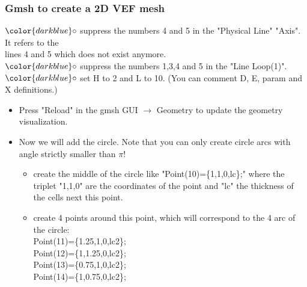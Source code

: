 \documentclass[10pt, hyperref={unicode=true,pdfusetitle, bookmarks=true,bookmarksnumbered=false,bookmarksopen=false, breaklinks=false,pdfborder={0 0l 1},backref=true,colorlinks=true,linkcolor=darkblue,pageanchor}]{beamer}
\begin{document}
\begin{frame}
\frametitle{Gmsh to create a 2D VEF mesh}
\begin{block}{}

\hspace{1cm} $\color{darkblue}\circ$ {\small{ suppress the numbers 4 and 5 in the "Physical Line" "Axis". It refers to the \\
\hspace{1.4cm} lines 4 and 5 which does not exist anymore.}}\\
\hspace{1cm} $\color{darkblue}\circ$ {\small{ suppress the numbers 1,3,4 and 5 in the "Line Loop(1)".}}\\
\hspace{1cm} $\color{darkblue}\circ$ {\small{ set H to 2 and L to 10. (You can comment D, E, param and X definitions.)}}

\begin{itemize}
\item Press "Reload" in the gmsh GUI $\rightarrow$ Geometry to update the geometry visualization.
\item Now we will add the circle. Note that you can only create circle arcs with angle strictly smaller than $\pi$!
    \begin{itemize}
    \item [$\circ$] create the middle of the circle like "Point(10)=\{1,1,0,lc\};" where the triplet "1,1,0" are the coordinates of the point and "lc" the thickness of the cells next this point.
    \item [$\circ$] create 4 points around this point, which will correspond to the 4 arc of the circle: \\
Point(11)=\{1.25,1,0,lc2\};\\
Point(12)=\{1,1.25,0,lc2\};\\
Point(13)=\{0.75,1,0,lc2\};\\
Point(14)=\{1,0.75,0,lc2\};
    \end{itemize}

\end{itemize}

\end{block}
\end{frame}
\end{document}
